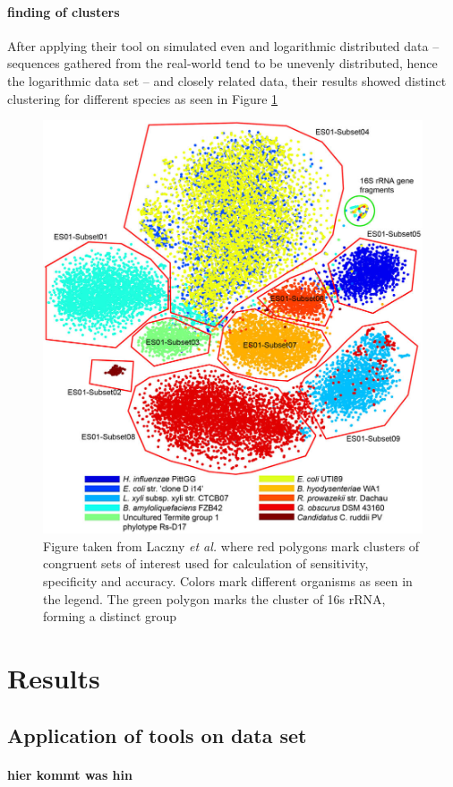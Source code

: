 \documentclass[twocolumn]{bmcart}%
\begin{document}
\paragraph*{finding of clusters}
After applying their tool on simulated even and logarithmic distributed data -- sequences gathered from the real-world tend to be unevenly distributed, hence the logarithmic data set -- and closely related data, their results showed distinct clustering for different species as seen in Figure \ref{img:clusterData1}
\begin{figure}[h]
	\centering
	\includegraphics[width=.65\textwidth]{bilder/clusterData1.jpg}
	\caption{Figure taken from Laczny \textit{et al.} \cite{Laczny2014} where red polygons mark clusters of congruent sets of interest used for calculation of sensitivity, specificity and accuracy. Colors mark different organisms as seen in the legend. The green polygon marks the cluster of 16s rRNA, forming a distinct group}
	\label{img:clusterData1}
\end{figure}
\section*{Results}
\subsection*{Application of tools on data set}
\paragraph*{hier kommt was hin}
\end{document}
